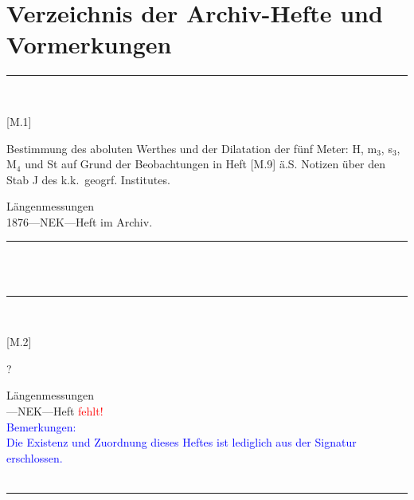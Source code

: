 

\chapter{Verzeichnis der Archiv-Hefte und Vormerkungen}
\parbox{\textwidth}{%
\rule{\textwidth}{1pt}\vspace*{-3mm}\\
\begin{minipage}[t]{0.2\textwidth}\vspace{0pt}
\Huge\rule[-4mm]{0cm}{1cm}[M.1]
\end{minipage}
\hfill
\begin{minipage}[t]{0.8\textwidth}\vspace{0pt}
\large Bestimmung des aboluten Werthes und der Dilatation der fünf Meter: H, m$_\mathrm{3}$, s$_\mathrm{3}$, M$_\mathrm{4}$ und St auf Grund der Beobachtungen in Heft [M.9] ä.S. Notizen über den Stab {\glqq}J{\grqq} des k.k.\ geogrf. Institutes.\rule[-2mm]{0mm}{2mm}
\end{minipage}
{\footnotesize\flushright
Längenmessungen\\
}
1876\quad---\quad NEK\quad---\quad Heft im Archiv.\\
\rule{\textwidth}{1pt}
}
\\
\vspace*{-2.5pt}\\
\parbox{\textwidth}{%
\rule{\textwidth}{1pt}\vspace*{-3mm}\\
\begin{minipage}[t]{0.2\textwidth}\vspace{0pt}
\Huge\rule[-4mm]{0cm}{1cm}[M.2]
\end{minipage}
\hfill
\begin{minipage}[t]{0.8\textwidth}\vspace{0pt}
\large ?\rule[-2mm]{0mm}{2mm}
\end{minipage}
{\footnotesize\flushright
Längenmessungen\\
}
\quad---\quad NEK\quad---\quad Heft \textcolor{red}{fehlt!}\\
\textcolor{blue}{Bemerkungen:\\{}
Die Existenz und Zuordnung dieses Heftes ist lediglich aus der Signatur erschlossen.\\{}
}
\\[-15pt]
\rule{\textwidth}{1pt}
}
